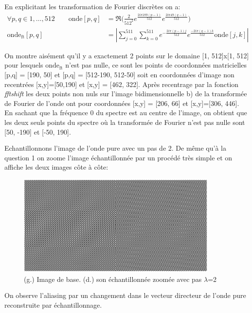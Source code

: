 \documentclass[a4paper, 11pt]{article}
\begin{document}
En explicitant les transformation de Fourier discrètes on a:
\begin{align}
\forall p, q \in 1,\dots,512 \qquad \text{onde}[p,q] &= \Re{\Big(\frac{2}{512^2} e^{\frac{2i\pi189(p-1)}{512}}
  e^{\frac{2i\pi49(q-1)}{512}}\Big)} \\
\text{onde}_{\text{ft}}[p,q] &= \left| \sum_{j=0}^{511} \sum_{k=0}^{511} e^{-\frac{2i\pi(p-1)j}{512}}
e^{\frac{-2i\pi(q-1)k}{512}} \text{onde}[j,k] \right|
\end{align}

On montre aisément qu'il y a exactement 2 points sur le domaine [1, 512]x[1, 512] pour lesquels $\text{onde}_{\text{ft}}$
n'est pas nulle, ce sont les points de coordonnées matricielles [p,q] = [190, 50] et [p,q] = [512-190, 512-50] soit en 
coordonnées d'image non recentrées [x,y]=[50,190] et [x,y] = [462, 322]. Après recentrage par la fonction \textit{fftshift}
les deux points non nuls sur l'image bidimensionnelle b) de la transformée de Fourier de l'onde ont pour coordonnées
[x,y] = [206, 66] et [x,y]=[306, 446]. En sachant que la fréquence 0 du spectre est au centre de l'image, on
obtient que les deux seuls points du spectre où la transformée de Fourier n'est pas nulle sont [50, -190] et [-50,
190].\\ 

\pagebreak

Echantillonnons l'image de l'onde pure avec un pas de 2. De même qu'à la question 1 on zoome l'image échantillonnée par
un procédé très simple et on affiche les deux images côte à côte:

\begin{figure}[!h]
\centering
\includegraphics[width=10cm]{onde_onde_ech.png}
\caption{(g.) Image de base. (d.) son échantillonnée zoomée avec pas $\lambda$=2}
\end{figure}

On observe l'aliasing par un changement dans le vecteur directeur de l'onde pure reconstruite par échantillonnage. \\
\end{document}
